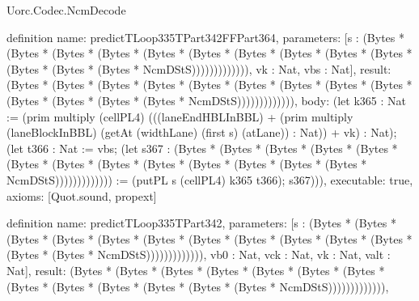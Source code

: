 \begin{lexlean}{Uorc.Codec.NcmDecode}
\begin{semanticmodule}
definition{
  name: predictTLoop335TPart342FFPart364,
  parameters: [s : (Bytes * (Bytes * (Bytes * (Bytes * (Bytes * (Bytes * (Bytes * (Bytes * (Bytes * (Bytes * (Bytes * (Bytes * (Bytes * NcmDStS))))))))))))), vk : Nat, vbs : Nat],
  result: (Bytes * (Bytes * (Bytes * (Bytes * (Bytes * (Bytes * (Bytes * (Bytes * (Bytes * (Bytes * (Bytes * (Bytes * (Bytes * NcmDStS))))))))))))),
  body: (let k365 : Nat := (prim multiply (cellPL4) (((laneEndHBLInBBL) + (prim multiply (laneBlockInBBL) (getAt (widthLane) (first s) (atLane)) : Nat)) + vk) : Nat); (let t366 : Nat := vbs; (let s367 : (Bytes * (Bytes * (Bytes * (Bytes * (Bytes * (Bytes * (Bytes * (Bytes * (Bytes * (Bytes * (Bytes * (Bytes * (Bytes * NcmDStS))))))))))))) := (putPL s (cellPL4) k365 t366); s367))),
  executable: true,
  axioms: [Quot.sound, propext]
}

definition{
  name: predictTLoop335TPart342,
  parameters: [s : (Bytes * (Bytes * (Bytes * (Bytes * (Bytes * (Bytes * (Bytes * (Bytes * (Bytes * (Bytes * (Bytes * (Bytes * (Bytes * NcmDStS))))))))))))), vb0 : Nat, vck : Nat, vk : Nat, valt : Nat],
  result: (Bytes * (Bytes * (Bytes * (Bytes * (Bytes * (Bytes * (Bytes * (Bytes * (Bytes * (Bytes * (Bytes * (Bytes * (Bytes * NcmDStS))))))))))))),
}
\end{semanticmodule}
\end{lexlean}
